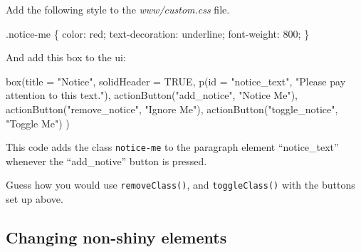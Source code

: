 \documentclass[
]{book}
\newenvironment{Shaded}{\begin{snugshade}}{\end{snugshade}}
\newcommand{\AttributeTok}[1]{\textcolor[rgb]{0.77,0.63,0.00}{#1}}
\newcommand{\ConstantTok}[1]{\textcolor[rgb]{0.00,0.00,0.00}{#1}}
\newcommand{\DecValTok}[1]{\textcolor[rgb]{0.00,0.00,0.81}{#1}}
\newcommand{\FunctionTok}[1]{\textcolor[rgb]{0.00,0.00,0.00}{#1}}
\newcommand{\NormalTok}[1]{#1}
\newcommand{\SpecialCharTok}[1]{\textcolor[rgb]{0.00,0.00,0.00}{#1}}
\newcommand{\StringTok}[1]{\textcolor[rgb]{0.31,0.60,0.02}{#1}}
\begin{document}
Add the following style to the \emph{www/custom.css} file.

\begin{Shaded}
\begin{Highlighting}[]
\NormalTok{.notice}\SpecialCharTok{{-}}\NormalTok{me \{}
\NormalTok{  color}\SpecialCharTok{:}\NormalTok{ red;}
\NormalTok{  text}\SpecialCharTok{{-}}\NormalTok{decoration}\SpecialCharTok{:}\NormalTok{ underline;}
\NormalTok{  font}\SpecialCharTok{{-}}\NormalTok{weight}\SpecialCharTok{:} \DecValTok{800}\NormalTok{;}
\NormalTok{\}}
\end{Highlighting}
\end{Shaded}

And add this box to the ui:

\begin{Shaded}
\begin{Highlighting}[]
\FunctionTok{box}\NormalTok{(}\AttributeTok{title =} \StringTok{"Notice"}\NormalTok{, }\AttributeTok{solidHeader =} \ConstantTok{TRUE}\NormalTok{,}
    \FunctionTok{p}\NormalTok{(}\AttributeTok{id =} \StringTok{"notice\_text"}\NormalTok{, }\StringTok{"Please pay attention to this text."}\NormalTok{),}
    \FunctionTok{actionButton}\NormalTok{(}\StringTok{"add\_notice"}\NormalTok{, }\StringTok{"Notice Me"}\NormalTok{),}
    \FunctionTok{actionButton}\NormalTok{(}\StringTok{"remove\_notice"}\NormalTok{, }\StringTok{"Ignore Me"}\NormalTok{),}
    \FunctionTok{actionButton}\NormalTok{(}\StringTok{"toggle\_notice"}\NormalTok{, }\StringTok{"Toggle Me"}\NormalTok{)}
\NormalTok{)}
\end{Highlighting}
\end{Shaded}

This code adds the class \texttt{notice-me} to the paragraph element ``notice\_text'' whenever the ``add\_notive'' button is pressed.

\begin{Shaded}
\end{Shaded}

Guess how you would use \texttt{removeClass()}, and \texttt{toggleClass()} with the buttons set up above.

\hypertarget{changing-non-shiny-elements}{%
\subsection{Changing non-shiny elements}\label{changing-non-shiny-elements}}
\end{document}

